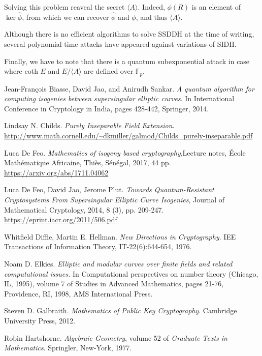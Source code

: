 \documentclass{article}
\theoremstyle{theorem}
\theoremstyle{definition}
\begin{document}
Solving this problem reaveal the secret $\langle A \rangle$. Indeed, $\phi(R)$ is an element of $\ker\hat{\phi}$, from which we can recover $\hat{\phi}$ and $\phi$, and thus $\langle A \rangle$. 

Although there is no efficient algorithms to solve SSDDH at the time of writing, several polynomial-time attacks have appeared  against variations of SIDH.

Finally, we have to note that there is a quantum subexponential attack \cite{IsogeniesSSEC} in case where coth $E$ and $E/\langle A \rangle$ are defined over $\mathbb{F}_p$.

\newpage
\begin{thebibliography}{}
	 Jean-François Biasse, David Jao, and Anirudh Sankar. \textit{A quantum algorithm for computing isogenies between supersingular elliptic curves}. In International Conference in Cryptology in India, pages 428-442, Springer, 2014.
	
	 Lindsay N. Childs. \textit{Purely Inseparable Field Extension}. \url{http://www.math.cornell.edu/~dkmiller/galmod/Childs_purely-inseparable.pdf}
	
	 Luca De Feo. \textit{Mathematics of isogeny based cryptography},Lecture notes, École Mathématique Africaine, Thiès, Sénégal, 2017, 44 pp. \url{https://arxiv.org/abs/1711.04062}
	
	 Luca De Feo, David Jao, Jerome Plut. \textit{Towards Quantum-Resistant Cryptosystems From Supersingular Elliptic Curve Isogenies}, Journal of Mathematical Cryptology, 2014, 8 (3), pp. 209-247. \url{https://eprint.iacr.org/2011/506.pdf}
	
	 Whitfield Diffie, Martin E. Hellman. \textit{New Directions in Cryptography}. IEE Transactions of Information Theory, IT-22(6):644-654, 1976.
	
	 Noam D. Elkies. \textit{Elliptic and modular curves over finite fields and related computational issues.} In Computational perspectives on number theory (Chicago, IL, 1995), volume 7 of Studies in Advanced Mathematics, pages 21-76, Providence, RI, 1998, AMS International Press.
	
	 Steven D. Galbraith. \textit{Mathematics of Public Key Cryptography}. Cambridge University Press, 2012.
	
	 Robin Hartshorne. \textit{Algebraic Geometry}, volume 52 of \textit{Graduate Texts in Mathematics}. Springler, New-York, 1977.
	

\end{thebibliography}
\end{document}
